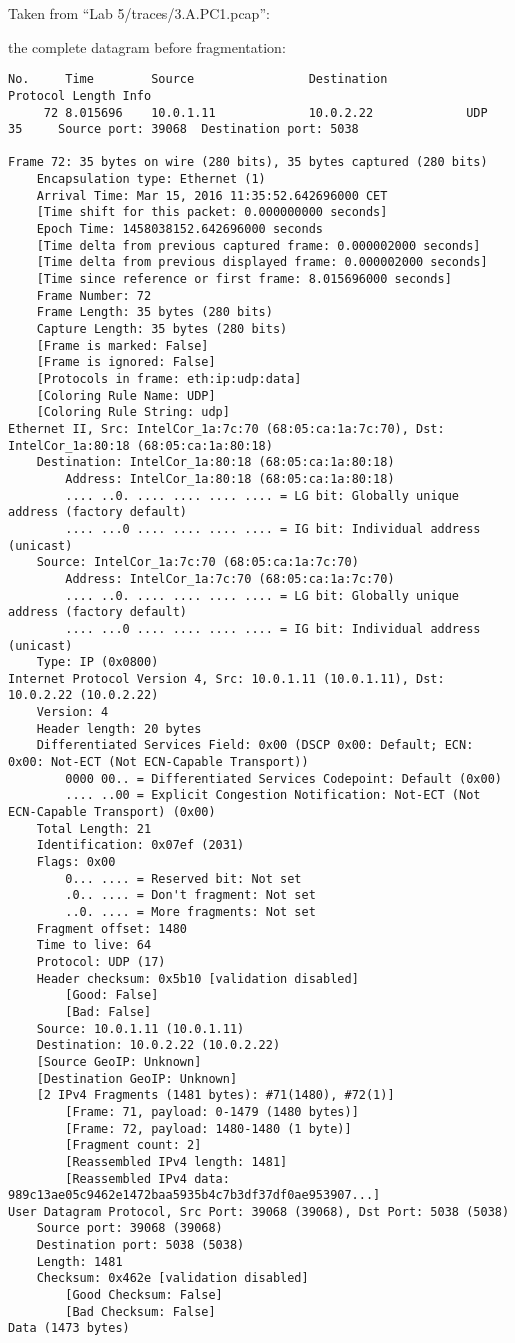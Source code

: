 Taken from ``Lab 5/traces/3.A.PC1.pcap'':

the complete datagram before fragmentation:
\begin{lstlisting}
No.     Time        Source                Destination           Protocol Length Info
     72 8.015696    10.0.1.11             10.0.2.22             UDP      35     Source port: 39068  Destination port: 5038

Frame 72: 35 bytes on wire (280 bits), 35 bytes captured (280 bits)
    Encapsulation type: Ethernet (1)
    Arrival Time: Mar 15, 2016 11:35:52.642696000 CET
    [Time shift for this packet: 0.000000000 seconds]
    Epoch Time: 1458038152.642696000 seconds
    [Time delta from previous captured frame: 0.000002000 seconds]
    [Time delta from previous displayed frame: 0.000002000 seconds]
    [Time since reference or first frame: 8.015696000 seconds]
    Frame Number: 72
    Frame Length: 35 bytes (280 bits)
    Capture Length: 35 bytes (280 bits)
    [Frame is marked: False]
    [Frame is ignored: False]
    [Protocols in frame: eth:ip:udp:data]
    [Coloring Rule Name: UDP]
    [Coloring Rule String: udp]
Ethernet II, Src: IntelCor_1a:7c:70 (68:05:ca:1a:7c:70), Dst: IntelCor_1a:80:18 (68:05:ca:1a:80:18)
    Destination: IntelCor_1a:80:18 (68:05:ca:1a:80:18)
        Address: IntelCor_1a:80:18 (68:05:ca:1a:80:18)
        .... ..0. .... .... .... .... = LG bit: Globally unique address (factory default)
        .... ...0 .... .... .... .... = IG bit: Individual address (unicast)
    Source: IntelCor_1a:7c:70 (68:05:ca:1a:7c:70)
        Address: IntelCor_1a:7c:70 (68:05:ca:1a:7c:70)
        .... ..0. .... .... .... .... = LG bit: Globally unique address (factory default)
        .... ...0 .... .... .... .... = IG bit: Individual address (unicast)
    Type: IP (0x0800)
Internet Protocol Version 4, Src: 10.0.1.11 (10.0.1.11), Dst: 10.0.2.22 (10.0.2.22)
    Version: 4
    Header length: 20 bytes
    Differentiated Services Field: 0x00 (DSCP 0x00: Default; ECN: 0x00: Not-ECT (Not ECN-Capable Transport))
        0000 00.. = Differentiated Services Codepoint: Default (0x00)
        .... ..00 = Explicit Congestion Notification: Not-ECT (Not ECN-Capable Transport) (0x00)
    Total Length: 21
    Identification: 0x07ef (2031)
    Flags: 0x00
        0... .... = Reserved bit: Not set
        .0.. .... = Don't fragment: Not set
        ..0. .... = More fragments: Not set
    Fragment offset: 1480
    Time to live: 64
    Protocol: UDP (17)
    Header checksum: 0x5b10 [validation disabled]
        [Good: False]
        [Bad: False]
    Source: 10.0.1.11 (10.0.1.11)
    Destination: 10.0.2.22 (10.0.2.22)
    [Source GeoIP: Unknown]
    [Destination GeoIP: Unknown]
    [2 IPv4 Fragments (1481 bytes): #71(1480), #72(1)]
        [Frame: 71, payload: 0-1479 (1480 bytes)]
        [Frame: 72, payload: 1480-1480 (1 byte)]
        [Fragment count: 2]
        [Reassembled IPv4 length: 1481]
        [Reassembled IPv4 data: 989c13ae05c9462e1472baa5935b4c7b3df37df0ae953907...]
User Datagram Protocol, Src Port: 39068 (39068), Dst Port: 5038 (5038)
    Source port: 39068 (39068)
    Destination port: 5038 (5038)
    Length: 1481
    Checksum: 0x462e [validation disabled]
        [Good Checksum: False]
        [Bad Checksum: False]
Data (1473 bytes)


\end{lstlisting}
